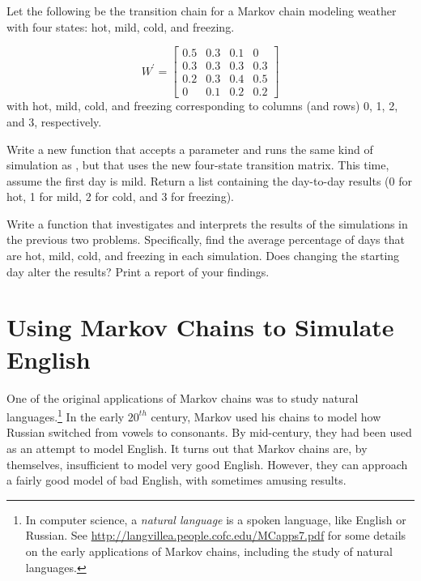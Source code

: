 \begin{problem} %
Let the following be the transition chain for a Markov chain modeling weather with four states: hot, mild, cold, and freezing.

\[ W^\prime = \left[\begin{array}{cccc}
0.5 & 0.3 & 0.1 & 0\\
0.3 & 0.3 & 0.3 & 0.3\\
0.2 & 0.3 & 0.4 & 0.5\\
  0 & 0.1 & 0.2 & 0.2\end{array} \right]\]
with hot, mild, cold, and freezing corresponding to columns (and rows) 0, 1, 2, and 3, respectively.

Write a new function that accepts a parameter  and runs the same kind of simulation as , but that uses the new four-state transition matrix.
This time, assume the first day is mild.
Return a list containing the day-to-day results (0 for hot, 1 for mild, 2 for cold, and 3 for freezing).
\label{problem:transition}
\end{problem}

\begin{problem} %
Write a function that investigates and interprets the results of the simulations in the previous two problems.
Specifically, find the average percentage of days that are hot, mild, cold, and freezing in each simulation.
Does changing the starting day alter the results?
Print a report of your findings.
\end{problem}

\section*{Using Markov Chains to Simulate English} %
One of the original applications of Markov chains was to study natural languages.\footnote{In computer science, a \emph{natural language} is a spoken language, like English or Russian. See \url{http://langvillea.people.cofc.edu/MCapps7.pdf} for some details on the early applications of Markov chains, including the study of natural languages.}
In the early $20^{th}$ century, Markov used his chains to model how Russian switched from vowels to consonants.
By mid-century, they had been used as an attempt to model English.
It turns out that Markov chains are, by themselves, insufficient to model very good English.
However, they can approach a fairly good model of bad English, with sometimes amusing results.


